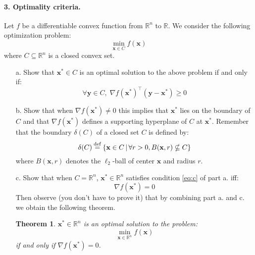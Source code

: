 \documentclass[11pt]{article}
\newtheorem{theorem}{Theorem}
\theoremstyle{remark}
\newcommand{\R}{\mathbb{R}}                     %
\newcommand{\eqdef}{\mathbin{\stackrel{\rm def}{=}}}
\newcommand{\bx}{\mathbf{x}}
\newcommand{\by}{\mathbf{y}}
\begin{document}
\paragraph{3. Optimality criteria.}
Let $f$ be a differentiable convex function from $\R^n$ to $\R$. We consider
the following optimization problem:
\begin{displaymath}
    \min_{\bx\in C} f(\bx)
\end{displaymath}
where $C\subseteq \R^n$ is a closed convex set.
\begin{itemize}
    \item[a.] Show that $\bx^*\in C$ is an optimal solution to the above problem
        if and only if:
        \begin{equation}
            \label{eq:c}
            \tag{P}
            \forall \by\in C,\; \nabla f(\bx^*)^\intercal (\by-\bx^*) \geq 0
        \end{equation}
    \item[b.] Show that when $\nabla f(\bx^*)\neq 0$ this implies that $\bx^*$
        lies on the boundary of $C$ and that $\nabla f(\bx^*)$ defines
        a supporting hyperplane of $C$ at $\bx^*$. Remember that the boundary
        $\delta(C)$ of a closed set $C$ is defined by:
        \begin{displaymath}
            \delta(C)\eqdef \left\{\bx\in C \,|\, \forall r > 0,
            B(\bx,r)\nsubseteq C\right\}
        \end{displaymath}
        where $B(\bx,r)$ denotes the $\ell_2$-ball of center $\bx$ and radius
        $r$.
    \item[c.] Show that when $C=\R^n$, $\bx^*\in\R^n$ satisfies condition \eqref{eq:c} of part a. iff:
        \begin{displaymath}
            \nabla f(\bx^*) = 0
        \end{displaymath}
        Then observe (you don't have to prove it) that by combining part a. and
        c. we obtain the following theorem.
        
        \begin{theorem}
        $\bx^*\in\R^n$ is an optimal solution to the problem:
        \begin{displaymath}
            \min_{\bx\in\R^n} f(\bx)
        \end{displaymath}
        if and only if $\nabla f(\bx^*) = 0$.
    \end{theorem}
\end{itemize}
\end{document}
